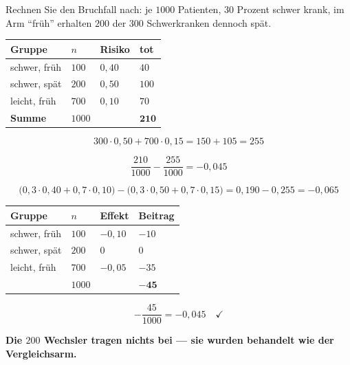\begin{aufgabe}
Rechnen Sie den Bruchfall nach: je $1000$ Patienten, $30$ Prozent schwer krank, im Arm \enquote{früh} erhalten $200$ der $300$ Schwerkranken dennoch spät.

\loesung
{}
\begin{center}
{\small
\renewcommand{\arraystretch}{1.46}
\begin{tabular}{@{}P{2.4cm}P{1.4cm}P{1.8cm}P{1.6cm}@{}}
\toprule
\textbf{Gruppe} & $n$ & \textbf{Risiko} & \textbf{tot}\\
\midrule
schwer, früh & $100$ & $0{,}40$ & $40$\\
schwer, spät & $200$ & $0{,}50$ & $100$\\
leicht, früh & $700$ & $0{,}10$ & $70$\\
\midrule
\textbf{Summe} & $1000$ & & $\mathbf{210}$\\
\bottomrule
\end{tabular}}
\end{center}

\[ 300\cdot0{,}50 + 700\cdot0{,}15 = 150 + 105 = 255 \]

\[ \frac{210}{1000} - \frac{255}{1000} = -0{,}045 \]

\[ \bigl(0{,}3\cdot0{,}40 + 0{,}7\cdot0{,}10\bigr) - \bigl(0{,}3\cdot0{,}50 + 0{,}7\cdot0{,}15\bigr) = 0{,}190 - 0{,}255 = -0{,}065 \]

\begin{center}
{\small
\renewcommand{\arraystretch}{1.46}
\begin{tabular}{@{}P{2.6cm}P{1.6cm}P{2.0cm}P{1.8cm}@{}}
\toprule
\textbf{Gruppe} & $n$ & \textbf{Effekt} & \textbf{Beitrag}\\
\midrule
schwer, früh & $100$ & $-0{,}10$ & $-10$\\
schwer, spät & $200$ & $0$ & $0$\\
leicht, früh & $700$ & $-0{,}05$ & $-35$\\
\midrule
& $1000$ & & $\mathbf{-45}$\\
\bottomrule
\end{tabular}}
\end{center}

\[ -\frac{45}{1000} = -0{,}045 \quad \checkmark \]

\begin{center}
\begin{minipage}{0.9\textwidth}
\textbf{Die $200$ Wechsler tragen nichts bei --- sie wurden behandelt wie der Vergleichsarm.}
\end{minipage}
\end{center}


\end{aufgabe}
